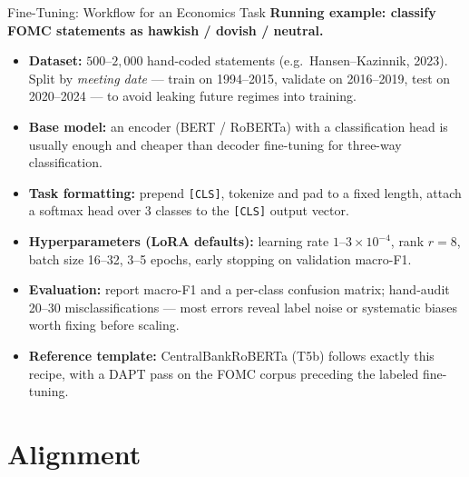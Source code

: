 \begin{frame}{Fine-Tuning: Workflow for an Economics Task}
\textbf{Running example: classify FOMC statements as hawkish / dovish / neutral.}
\begin{itemize}
\item \textbf{Dataset:} $500$--$2{,}000$ hand-coded statements (e.g.\ Hansen--Kazinnik, 2023). Split by \emph{meeting date} --- train on 1994--2015, validate on 2016--2019, test on 2020--2024 --- to avoid leaking future regimes into training.

\medskip
\item \textbf{Base model:} an encoder (BERT / RoBERTa) with a classification head is usually enough and cheaper than decoder fine-tuning for three-way classification.

\medskip
\item \textbf{Task formatting:} prepend \texttt{[CLS]}, tokenize and pad to a fixed length, attach a softmax head over 3 classes to the \texttt{[CLS]} output vector.

\medskip
\item \textbf{Hyperparameters (LoRA defaults):} learning rate $1$--$3 \times 10^{-4}$, rank $r = 8$, batch size 16--32, 3--5 epochs, early stopping on validation macro-F1.

\medskip
\item \textbf{Evaluation:} report macro-F1 and a per-class confusion matrix; hand-audit 20--30 misclassifications --- most errors reveal label noise or systematic biases worth fixing before scaling.

\medskip
\item \textbf{Reference template:} CentralBankRoBERTa (T5b) follows exactly this recipe, with a DAPT pass on the FOMC corpus preceding the labeled fine-tuning.
\end{itemize}
\end{frame}

\section{Alignment}

